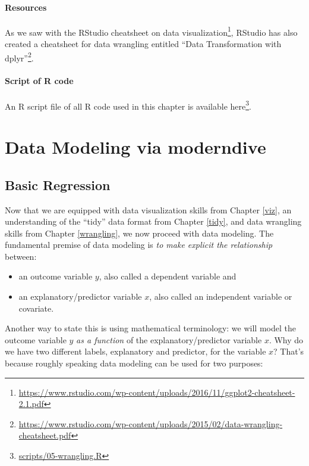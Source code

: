 \documentclass[12pt,]{krantz}
\providecommand{\tightlist}{%
  \setlength{\itemsep}{0pt}\setlength{\parskip}{0pt}}
\renewcommand{\href}[2]{#2\footnote{\url{#1}}}
\begin{document}
\subsection{Resources}\label{resources-1}

As we saw with the RStudio cheatsheet on
\href{https://www.rstudio.com/wp-content/uploads/2016/11/ggplot2-cheatsheet-2.1.pdf}{data
visualization}, RStudio has also created a cheatsheet for data wrangling
entitled
\href{https://www.rstudio.com/wp-content/uploads/2015/02/data-wrangling-cheatsheet.pdf}{``Data
Transformation with dplyr''}.

\subsection{Script of R code}\label{script-of-r-code-2}

An R script file of all R code used in this chapter is available
\href{scripts/05-wrangling.R}{here}.

\part{Data Modeling via
moderndive}\label{part-data-modeling-via-moderndive}

\chapter{Basic Regression}\label{regression}

Now that we are equipped with data visualization skills from Chapter
\ref{viz}, an understanding of the ``tidy'' data format from Chapter
\ref{tidy}, and data wrangling skills from Chapter \ref{wrangling}, we
now proceed with data modeling. The fundamental premise of data modeling
is \emph{to make explicit the relationship} between:

\begin{itemize}
\tightlist
\item
  an outcome variable \(y\), also called a dependent variable and
\item
  an explanatory/predictor variable \(x\), also called an independent
  variable or covariate.
\end{itemize}

Another way to state this is using mathematical terminology: we will
model the outcome variable \(y\) \emph{as a function} of the
explanatory/predictor variable \(x\). Why do we have two different
labels, explanatory and predictor, for the variable \(x\)? That's
because roughly speaking data modeling can be used for two purposes:
\end{document}
